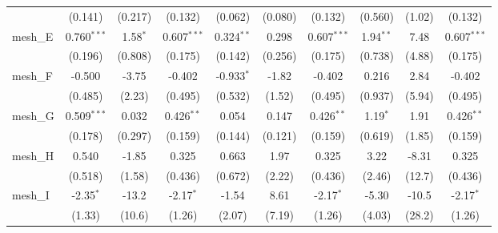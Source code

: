 \begin{tabular}{lccccccccc}
                                                               & (0.141)        & (0.217)        & (0.132)        & (0.062)        & (0.080)       & (0.132)        & (0.560)        & (1.02)        & (0.132)\\   
   mesh\_E                                                     & 0.760$^{***}$  & 1.58$^{*}$     & 0.607$^{***}$  & 0.324$^{**}$   & 0.298         & 0.607$^{***}$  & 1.94$^{**}$    & 7.48          & 0.607$^{***}$\\   
                                                               & (0.196)        & (0.808)        & (0.175)        & (0.142)        & (0.256)       & (0.175)        & (0.738)        & (4.88)        & (0.175)\\   
   mesh\_F                                                     & -0.500         & -3.75          & -0.402         & -0.933$^{*}$   & -1.82         & -0.402         & 0.216          & 2.84          & -0.402\\   
                                                               & (0.485)        & (2.23)         & (0.495)        & (0.532)        & (1.52)        & (0.495)        & (0.937)        & (5.94)        & (0.495)\\   
   mesh\_G                                                     & 0.509$^{***}$  & 0.032          & 0.426$^{**}$   & 0.054          & 0.147         & 0.426$^{**}$   & 1.19$^{*}$     & 1.91          & 0.426$^{**}$\\   
                                                               & (0.178)        & (0.297)        & (0.159)        & (0.144)        & (0.121)       & (0.159)        & (0.619)        & (1.85)        & (0.159)\\   
   mesh\_H                                                     & 0.540          & -1.85          & 0.325          & 0.663          & 1.97          & 0.325          & 3.22           & -8.31         & 0.325\\   
                                                               & (0.518)        & (1.58)         & (0.436)        & (0.672)        & (2.22)        & (0.436)        & (2.46)         & (12.7)        & (0.436)\\   
   mesh\_I                                                     & -2.35$^{*}$    & -13.2          & -2.17$^{*}$    & -1.54          & 8.61          & -2.17$^{*}$    & -5.30          & -10.5         & -2.17$^{*}$\\   
                                                               & (1.33)         & (10.6)         & (1.26)         & (2.07)         & (7.19)        & (1.26)         & (4.03)         & (28.2)        & (1.26)\\   

\end{tabular}
